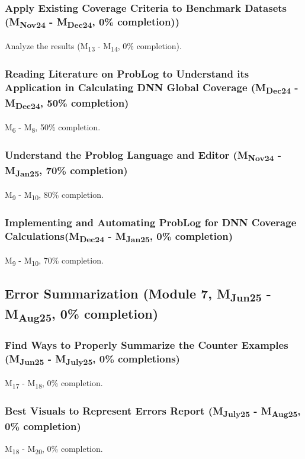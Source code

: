\subsubsection{Apply Existing Coverage Criteria to Benchmark Datasets (M\textsubscript{Nov24} - M\textsubscript{Dec24}, 0\% completion))}
Analyze the results (M\textsubscript{13} - M\textsubscript{14}, 0\% completion).

\subsubsection{Reading Literature on ProbLog to Understand its Application in Calculating DNN Global Coverage (M\textsubscript{Dec24} - M\textsubscript{Dec24}, 50\% completion)}
M\textsubscript{6} - M\textsubscript{8}, 50\% completion.

\subsubsection{Understand the Problog Language and Editor (M\textsubscript{Nov24} - M\textsubscript{Jan25}, 70\% completion)}
M\textsubscript{9} - M\textsubscript{10}, 80\% completion.

\subsubsection{Implementing and Automating ProbLog for DNN Coverage Calculations(M\textsubscript{Dec24} - M\textsubscript{Jan25}, 0\% completion)}
M\textsubscript{9} - M\textsubscript{10}, 70\% completion.

\subsection{Error Summarization (Module 7, M\textsubscript{Jun25} - M\textsubscript{Aug25}, 0\% completion)}
\subsubsection{Find Ways to Properly Summarize the Counter Examples (M\textsubscript{Jun25} - M\textsubscript{July25}, 0\% completions)}
M\textsubscript{17} - M\textsubscript{18}, 0\% completion.

\subsubsection{Best Visuals to Represent Errors Report (M\textsubscript{July25} - M\textsubscript{Aug25}, 0\% completion)} 
M\textsubscript{18} - M\textsubscript{20}, 0\% completion.

